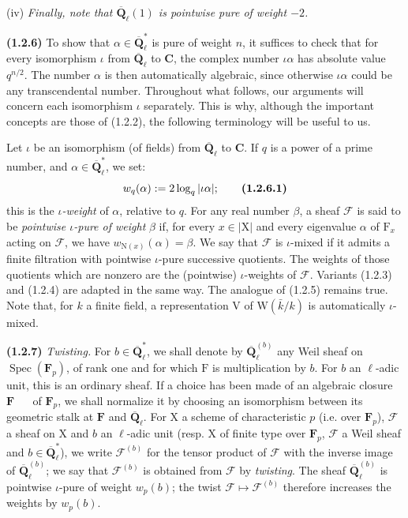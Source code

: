 \documentclass[11pt,leqno]{article}
\newcommand{\Page}[1]{\ifvmode\noindent\else\unskip\ \fi{\footnotesize\textcolor{gray}{[p.\,#1]}}\ \ignorespaces}
\begin{document}
(iv) \textit{Finally, note that \(\overline{\mathbf{Q}}_\ell(1)\) is pointwise pure of weight \(-2\).}

\textbf{(1.2.6)} To show that \(\alpha\in\overline{\mathbf{Q}}_\ell^*\) is pure of weight \(n\), it suffices to check that for every isomorphism \(\iota\) from \(\overline{\mathbf{Q}}_\ell\) to \(\mathbf{C}\), the complex number \(\iota\alpha\) has absolute value \(q^{n/2}\). The number \(\alpha\) is then automatically algebraic, since otherwise \(\iota\alpha\) could be any transcendental number. Throughout what follows, our arguments will concern each isomorphism \(\iota\) separately. This is why, although the important concepts are those of (1.2.2), the following terminology will be useful to us.

Let \(\iota\) be an isomorphism (of fields) from \(\overline{\mathbf{Q}}_\ell\) to \(\mathbf{C}\). If \(q\) is a power of a prime number, and \(\alpha\in\overline{\mathbf{Q}}_\ell^*\), we set:
\[
w_q(\alpha):=2\log_q|\iota\alpha|;
\tag*{\textbf{(1.2.6.1)}}
\]
this is the \textit{\(\iota\)-weight} of \(\alpha\), relative to \(q\). For any real number \(\beta\), a sheaf \(\mathscr{F}\) is said to be \textit{pointwise \(\iota\)-pure of weight} \(\beta\) if, for every \(x\in|\mathrm{X}|\) and every eigenvalue \(\alpha\) of \(\mathrm{F}_x\) acting on \(\mathscr{F}\), we have \(w_{\mathrm{N}(x)}(\alpha)=\beta\). We say that \(\mathscr{F}\) is \(\iota\)-mixed if it admits a finite filtration with pointwise \(\iota\)-pure successive quotients. The weights of those quotients which are nonzero are the (pointwise) \(\iota\)-weights of \(\mathscr{F}\). Variants (1.2.3) and (1.2.4) are adapted in the same way. The analogue of (1.2.5) remains true. Note that, for \(k\) a finite field, a representation \(\mathrm{V}\) of \(\mathrm{W}(\bar{k}/k)\) is automatically \(\iota\)-mixed.

\textbf{(1.2.7)} \textit{Twisting.} For \(b\in\overline{\mathbf{Q}}_\ell^*\), we shall denote by \(\overline{\mathbf{Q}}_\ell^{(b)}\) any Weil sheaf on \(\operatorname{Spec}(\mathbf{F}_p)\), of rank one and for which \(\mathrm{F}\) is multiplication by \(b\). For \(b\) an \(\ell\)-adic unit, this is an ordinary sheaf. If a choice has been made of an algebraic closure \(\mathbf{F}\)
\Page{155}
of \(\mathbf{F}_p\), we shall normalize it by choosing an isomorphism between its geometric stalk at \(\mathbf{F}\) and \(\overline{\mathbf{Q}}_\ell\). For \(\mathrm{X}\) a scheme of characteristic \(p\) (i.e. over \(\mathbf{F}_p\)), \(\mathscr{F}\) a sheaf on \(\mathrm{X}\) and \(b\) an \(\ell\)-adic unit (resp. \(\mathrm{X}\) of finite type over \(\mathbf{F}_p\), \(\mathscr{F}\) a Weil sheaf and \(b\in\overline{\mathbf{Q}}_\ell^*\)), we write \(\mathscr{F}^{(b)}\) for the tensor product of \(\mathscr{F}\) with the inverse image of \(\overline{\mathbf{Q}}_\ell^{(b)}\); we say that \(\mathscr{F}^{(b)}\) is obtained from \(\mathscr{F}\) by \textit{twisting}. The sheaf \(\overline{\mathbf{Q}}_\ell^{(b)}\) is pointwise \(\iota\)-pure of weight \(w_p(b)\); the twist \(\mathscr{F}\mapsto\mathscr{F}^{(b)}\) therefore increases the weights by \(w_p(b)\).
\end{document}
